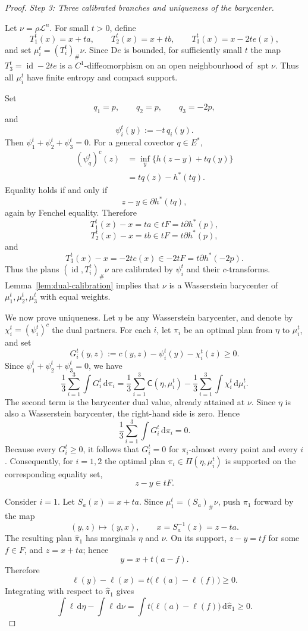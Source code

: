 \documentclass[10pt,a4paper]{amsart}
\numberwithin{equation}{section}
\newcommand{\id}{\operatorname{id}}
\newcommand{\supp}{\operatorname{spt}}
\newcommand{\dd}{\mathrm d}
\newcommand{\D}{\mathrm D}
\newcommand{\cL}{\mathcal L}
\begin{document}
\begin{proof}
		\medskip
		\noindent\emph{Step 3: Three calibrated branches and uniqueness of the barycenter.}
		
		Let $\nu=\rho\cL^n$. For small $t>0$, define
		\[
		T_1^t(x)=x+ta,
		\qquad T_2^t(x)=x+tb,
		\qquad T_3^t(x)=x-2t e(x),
		\]
		and set $\mu_i^t=(T_i^t)_\#\nu$. Since \(\D e\) is bounded, for sufficiently small \(t\) the map \(T_3^t=\id-2t e\) is a \(C^1\)-diffeomorphism on an open neighbourhood of \(\supp\nu\). Thus all $\mu_i^t$ have finite entropy and compact support.
		
		Set
		\[
		q_1=p,
		\qquad q_2=p,
		\qquad q_3=-2p,
		\]
		and
		\[
		\psi_i^t(y):=-t\,q_i(y).
		\]
		Then $\psi_1^t+\psi_2^t+\psi_3^t=0$. For a general covector $q\in E^*$,
		\[
		\begin{aligned}
			(\psi_q^t)^c(z)
			&=\inf_y\{h(z-y)+tq(y)\} \\
			&=tq(z)-h^*(tq).
		\end{aligned}
		\]
		Equality holds if and only if
		\[
		z-y\in\partial h^*(tq),
		\]
		again by Fenchel equality. Therefore
		\[
		T_1^t(x)-x=ta\in tF=t\partial h^*(p),
		\]
		\[
		T_2^t(x)-x=tb\in tF=t\partial h^*(p),
		\]
		and
		\[
		T_3^t(x)-x=-2t e(x)\in -2tF=t\partial h^*(-2p).
		\]
		Thus the plans $(\id,T_i^t)_\#\nu$ are calibrated by $\psi_i^t$ and their $c$-transforms. Lemma~\ref{lem:dual-calibration} implies that $\nu$ is a Wasserstein barycenter of $\mu_1^t,\mu_2^t,\mu_3^t$ with equal weights.
		
		We now prove uniqueness. Let $\eta$ be any Wasserstein barycenter, and denote by $\chi_i^t=(\psi_i^t)^c$ the dual partners. For each \(i\), let \(\pi_i\) be an optimal plan from \(\eta\) to \(\mu_i^t\), and set
		\[
		G_i^t(y,z):=c(y,z)-\psi_i^t(y)-\chi_i^t(z)\ge0.
		\]
		Since \(\psi_1^t+\psi_2^t+\psi_3^t=0\), we have
		\[
		\frac13\sum_{i=1}^3\int G_i^t\,\dd\pi_i
		=
		\frac13\sum_{i=1}^3 \mathsf C(\eta,\mu_i^t)
		-
		\frac13\sum_{i=1}^3\int \chi_i^t\,\dd\mu_i^t.
		\]
		The second term is the barycenter dual value, already attained at \(\nu\). Since
		\(\eta\) is also a Wasserstein barycenter, the right-hand side is zero. Hence
		\[
		\frac13\sum_{i=1}^3\int G_i^t\,\dd\pi_i=0.
		\]
		Because every \(G_i^t\ge0\), it follows that
		\(G_i^t=0\) for \(\pi_i\)-almost every point and every \(i\). Consequently, for $i=1,2$ the optimal plan $\pi_i\in\Pi(\eta,\mu_i^t)$ is supported on the corresponding equality set,
		\[
		z-y\in tF.
		\]
		
		Consider $i=1$. Let $S_a(x)=x+ta$. Since $\mu_1^t=(S_a)_\#\nu$, push $\pi_1$ forward by the map
		\[
		(y,z)\longmapsto (y,x),\qquad x=S_a^{-1}(z)=z-ta.
		\]
		The resulting plan $\widehat\pi_1$ has marginals $\eta$ and $\nu$. On its support, $z-y=tf$ for some $f\in F$, and $z=x+ta$; hence
		\[
		y=x+t(a-f).
		\]
		Therefore
		\[
		\ell(y)-\ell(x)=t\bigl(\ell(a)-\ell(f)\bigr)\ge0.
		\]
		Integrating with respect to $\widehat\pi_1$ gives
		\begin{equation}\label{eq:anchor-a-ineq}
			\int \ell\,\dd\eta-\int \ell\,\dd\nu
			=\int t\bigl(\ell(a)-\ell(f)\bigr)\,\dd\widehat\pi_1\ge0.
		\end{equation}
		

\end{proof}
\end{document}
